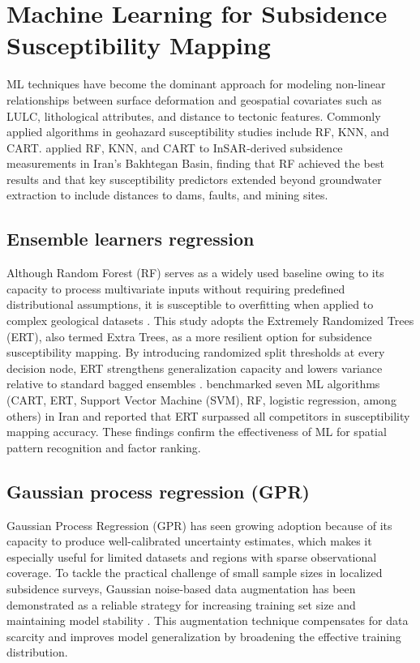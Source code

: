 \documentclass[oneside,doublespacing,flushright]{lsuthesis}
\begin{document}
\section{Machine Learning for Subsidence Susceptibility Mapping}

ML techniques have become the dominant approach for modeling non-linear relationships between surface deformation and geospatial covariates such as LULC, lithological attributes, and distance to tectonic features. Commonly applied algorithms in geohazard susceptibility studies include RF, KNN, and CART. \citet{Gharechaee2023} applied RF, KNN, and CART to InSAR-derived subsidence measurements in Iran's Bakhtegan Basin, finding that RF achieved the best results and that key susceptibility predictors extended beyond groundwater extraction to include distances to dams, faults, and mining sites.

\subsection{Ensemble learners regression}


Although Random Forest (RF) serves as a widely used baseline owing to its capacity to process multivariate inputs without requiring predefined distributional assumptions, 
it is susceptible to overfitting when applied to complex geological datasets \citep{Breiman2001}. This study adopts the Extremely Randomized Trees (ERT), also termed Extra Trees, as a more resilient option for subsidence susceptibility mapping. By introducing randomized split thresholds at every decision node, ERT strengthens generalization capacity and lowers variance relative to standard bagged ensembles \citep{Geurts2006}. \citet{HosseinzadehLLand2024} benchmarked seven ML algorithms (CART, ERT, Support Vector Machine (SVM), RF, logistic regression, among others) in Iran and reported that ERT surpassed all competitors in susceptibility mapping accuracy. These findings confirm the effectiveness of ML for spatial pattern recognition and factor ranking.
\subsection{Gaussian process regression (GPR)}

Gaussian Process Regression (GPR) has seen growing adoption because of its capacity to produce well-calibrated uncertainty estimates, which makes it especially useful for limited datasets and regions with sparse observational coverage. To tackle the practical challenge of small sample sizes in localized subsidence surveys, Gaussian noise-based data augmentation has been demonstrated as a reliable strategy for increasing training set size and maintaining model stability \citep{Shorten2019}. This augmentation technique compensates for data scarcity and improves model generalization by broadening the effective training distribution.
\end{document}
